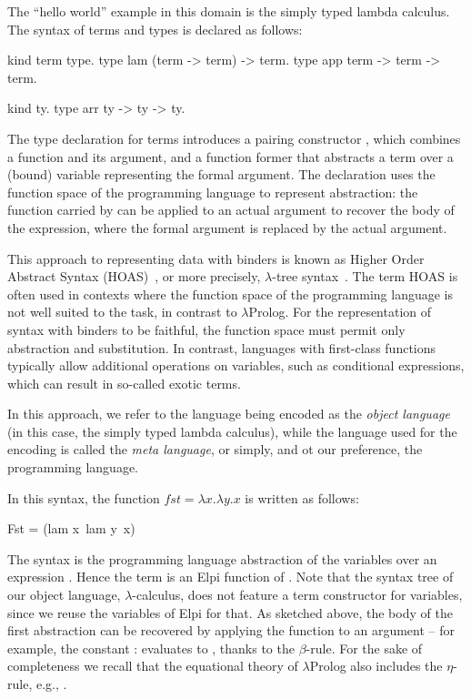 \documentclass[a4paper, 11pt]{book}
\begin{document}
The ``hello world'' example in this domain is the simply typed lambda
calculus. %
The syntax of terms and types is declared as follows:

\begin{elpicode}
kind term type.
type lam (term -> term) -> term.
type app term -> term -> term.

kind ty.
type arr ty -> ty -> ty.
\end{elpicode}

The type declaration for terms introduces a pairing constructor ,
which combines a function and its argument, and a function former 
that abstracts a term over a (bound) variable representing the formal
argument. The declaration uses the function space of the programming language
to represent abstraction: the function carried by  can be applied to
an actual argument to recover the body of the expression, where the formal
argument is replaced by the actual argument.

This approach to representing data with binders is known as Higher Order
Abstract Syntax (HOAS)~\cite{10.1145/960116.54010}, or more precisely,
$\lambda$-tree syntax~\cite{Miller2018MechanizedMR}. The term HOAS is often
used in contexts where the function space of the programming language is not
well suited to the task, in contrast to $\lambda$Prolog. For the representation
of syntax with binders to be faithful, the function space must permit only
abstraction and substitution. In contrast, languages with first-class
functions typically allow
additional operations on variables, such as conditional expressions, which can result
in so-called exotic terms.

In this approach, we refer to the language being
encoded as the \emph{object language} (in this case, the simply typed lambda
calculus), while the language used for the encoding is called the \emph{meta language},
or simply, and ot our preference, the programming language.

In this syntax, the function $fst = \lambda x.\lambda y.x$ is written as
follows:

\begin{elpicode}
Fst = (lam x\ lam y\ x)
\end{elpicode}
The syntax  is the programming language abstraction of the
variables  over an expression . Hence
the term  is an Elpi function of . Note that
the syntax tree of our object language,
$\lambda$-calculus, does not feature a term constructor for variables, since
we reuse the variables of Elpi for that. As sketched above, the body of the first
abstraction can be recovered by applying the function to an argument -- for
example, the constant :  evaluates to
, thanks to the $\beta$-rule. For the sake of
completeness we recall that the equational theory of $\lambda$Prolog
also includes the $\eta$-rule, e.g., .
\end{document}
